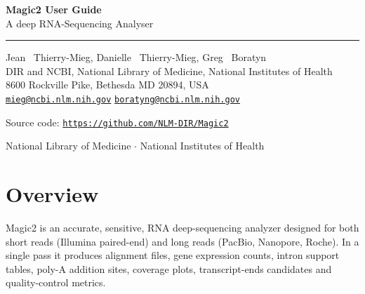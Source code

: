 \documentclass[11pt]{article}
\begin{document}
\begin{titlepage}
\vspace*{20mm}
{\Huge \textbf{Magic2 User Guide}}\\[4mm]
{\Large A deep RNA-Sequencing Analyser}\\[2mm]
\vspace{8mm}
\hrule
\vspace{8mm}
{\large Jean ~Thierry-Mieg, Danielle ~Thierry-Mieg, Greg ~Boratyn}\\[2mm]
DIR and NCBI, National Library of Medicine, National Institutes of Health\\
8600 Rockville Pike, Bethesda MD 20894, USA\\[2mm]
\href{mailto:mieg@ncbi.nlm.nih.gov}{\texttt{mieg@ncbi.nlm.nih.gov}}
\href{mailto:boratyng@ncbi.nlm.nih.gov}{\texttt{boratyng@ncbi.nlm.nih.gov}}
\vspace{8mm}

\noindent Source code: \href{https://github.com/NLM-DIR/Magic2}{\texttt{https://github.com/NLM-DIR/Magic2}}

\vfill
\small National Library of Medicine $\cdot$ National Institutes of Health
\end{titlepage}

\newpage
\tableofcontents
\newpage

\section{Overview}

Magic2 is an accurate, sensitive, RNA deep-sequencing analyzer designed for
both short reads (Illumina paired-end) and long reads (PacBio, Nanopore,
Roche).  In a single pass it produces alignment files, gene expression
counts, intron support tables, poly-A addition sites, coverage plots,
transcript-ends candidates and
quality-control metrics.
\end{document}
